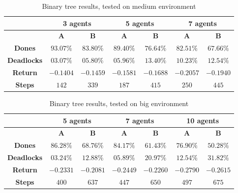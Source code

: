 \documentclass[a4paper,10pt]{report}
\begin{document}
\begin{table}[h]
	\center
	\begin{tabular}{|c|c|c|c|c|c|c|}
		\hline
							   & \multicolumn{2}{c|}{\textbf{3 agents}} & \multicolumn{2}{c|}{\textbf{5 agents}} & \multicolumn{2}{c|}{\textbf{7 agents}} \\ \hline
							   & \textbf{A} & \textbf{B} & \textbf{A} & \textbf{B} & \textbf{A} & \textbf{B} \\ \hline
		\textbf{Dones}      & $93.07\%$ & $83.80\%$ & $89.40\%$ & $76.64\%$ & $82.51\%$ & $67.66\%$ \\ \hline
		\textbf{Deadlocks}  & $03.07\%$ & $05.80\%$ & $05.96\%$ & $13.40\%$ & $10.23\%$ & $12.54\%$ \\ \hline
		\textbf{Return} & $-0.1404$ & $-0.1459$ & $-0.1581$ & $-0.1688$ & $-0.2057$ & $-0.1940$ \\ \hline
		\textbf{Steps}   & $142$ & $339$ & $187$ & $415$ & $250$ & $445$ \\ \hline
	\end{tabular}
	\caption{Binary tree results, tested on medium environment}
	\label{table:bt-medium-res}
\end{table}

\begin{table}[h]
	\center
	\begin{tabular}{|c|c|c|c|c|c|c|}
		\hline
							   & \multicolumn{2}{c|}{\textbf{5 agents}} & \multicolumn{2}{c|}{\textbf{7 agents}} & \multicolumn{2}{c|}{\textbf{10 agents}} \\ \hline
							   & \textbf{A} & \textbf{B} & \textbf{A} & \textbf{B} & \textbf{A} & \textbf{B} \\ \hline
		\textbf{Dones}      & $86.28\%$ & $68.76\%$ & $84.17\%$ & $61.43\%$ & $76.90\%$ & $50.28\%$ \\ \hline
		\textbf{Deadlocks}  & $03.24\%$ & $12.88\%$ & $05.89\%$ & $20.97\%$ & $12.54\%$ & $31.82\%$ \\ \hline
		\textbf{Return} & $-0.2331$ & $-0.2081$ & $-0.2449$ & $-0.2260$ & $-0.2790$ & $-0.2615$ \\ \hline
		\textbf{Steps}   & $400$ & $637$ & $447$ & $650$ & $497$ & $675$ \\ \hline
	\end{tabular}
	\caption{Binary tree results, tested on big environment}
	\label{table:bt-big-res}
\end{table}
\end{document}
